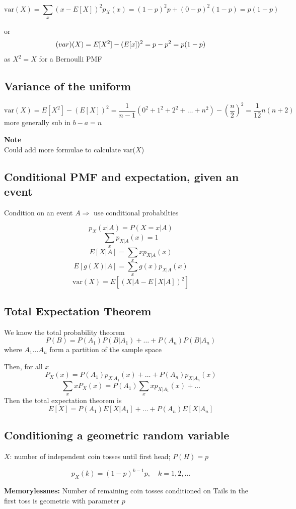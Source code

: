 \documentclass{article}
\begin{document}
\[
\text{var}(X) = \sum_{x}(x-E[X])^2p_X(x) = (1-p)^2p + (0-p)^2(1-p) = p(1-p)
\]

or
\[
\text(var)(X) = E[X^2]- (E[x])^2 = p - p^2 = p(1-p)
\]
as \(X^2 = X\) for a Bernoulli PMF

\subsection*{Variance of the uniform}
\[
\text{var}(X) = E[X^2] - (E[X])^2 = \frac{1}{n-1} (0^2 + 1^2 + 2^2 + \dots + n^2) - (\frac{n}{2})^2 = \frac{1}{12}n(n+2)
\]
more generally sub in \(b-a = n\)

\textbf{Note}\\
Could add more formulae to calculate var(\(X\))

\subsection*{Conditional PMF and expectation, given an event}
Condition on an event \(A \Rightarrow\) use conditional probabilties

\[
p_X(x|A) = P(X=x|A) 
\]
\[
\sum_x p_{X|A}(x) = 1
\]
\[
E[X|A] = \sum_x xp_{X|A}(x)
\]
\[
E[g(X)|A] = \sum_x g(x)p_{X|A}(x)
\]
\[
\text{var}(X) = E[(X|A-E[X|A])^2]
\]

\subsection*{Total Expectation Theorem}
We know the total probability theorem
\[
P(B) = P(A_1)P(B|A_1)+\dots + P(A_n)P(B|A_n)
\]
where \(A_1 \dots A_n\) form a partition of the sample space

Then, for all \(x\)
\[
P_X(x) = P(A_1) p_{X|A_1}(x) + \dots + P(A_n)p_{X|A_n}(x)
\]
\[
\sum_x xP_X(x) = P(A_1) \sum_x x p_{X|A_1}(x) + \dots
\]
Then the total expectation theorem is
\[
E[X] = P(A_1)E[X|A_1] + \dots + P(A_n)E[X|A_n]
\]



\subsection*{Conditioning a geometric random variable}
\(X\): number of independent coin tosses until first head; \(P(H) = p\)

\[
p_X(k) = (1-p)^{k-1}p, \quad k = 1,2,\dots
\]

\textbf{Memorylessnes:} Number of remaining coin tosses conditioned on Tails in the first toss is geometric with parameter \(p\)
\end{document}
